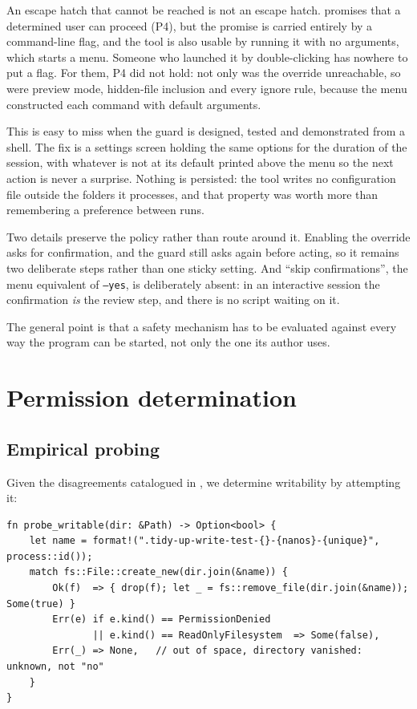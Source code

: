 \documentclass[11pt,a4paper]{article}
\newcommand{\code}[1]{\texttt{\small #1}}
\begin{document}
An escape hatch that cannot be reached is not an escape hatch. 
promises that a determined user can proceed (P4), but the promise is carried entirely
by a command-line flag, and the tool is also usable by running it with no arguments,
which starts a menu. Someone who launched it by double-clicking has nowhere to put a
flag. For them, P4 did not hold: not only was the override unreachable, so were
preview mode, hidden-file inclusion and every ignore rule, because the menu
constructed each command with default arguments.

This is easy to miss when the guard is designed, tested and demonstrated from a
shell. The fix is a settings screen holding the same options for the duration of the
session, with whatever is not at its default printed above the menu so the next
action is never a surprise. Nothing is persisted: the tool writes no configuration
file outside the folders it processes, and that property was worth more than
remembering a preference between runs.

Two details preserve the policy rather than route around it. Enabling the override
asks for confirmation, and the guard still asks again before acting, so it remains
two deliberate steps rather than one sticky setting. And \enquote{skip
confirmations}, the menu equivalent of \code{--yes}, is deliberately absent: in an
interactive session the confirmation \emph{is} the review step, and there is no
script waiting on it.

The general point is that a safety mechanism has to be evaluated against every way
the program can be started, not only the one its author uses.

\section{Permission determination}
\label{sec:perm}

\subsection{Empirical probing}

Given the disagreements catalogued in , we determine writability by
attempting it:

\begin{lstlisting}
fn probe_writable(dir: &Path) -> Option<bool> {
    let name = format!(".tidy-up-write-test-{}-{nanos}-{unique}", process::id());
    match fs::File::create_new(dir.join(&name)) {
        Ok(f)  => { drop(f); let _ = fs::remove_file(dir.join(&name)); Some(true) }
        Err(e) if e.kind() == PermissionDenied
               || e.kind() == ReadOnlyFilesystem  => Some(false),
        Err(_) => None,   // out of space, directory vanished: unknown, not "no"
    }
}
\end{lstlisting}
\end{document}
